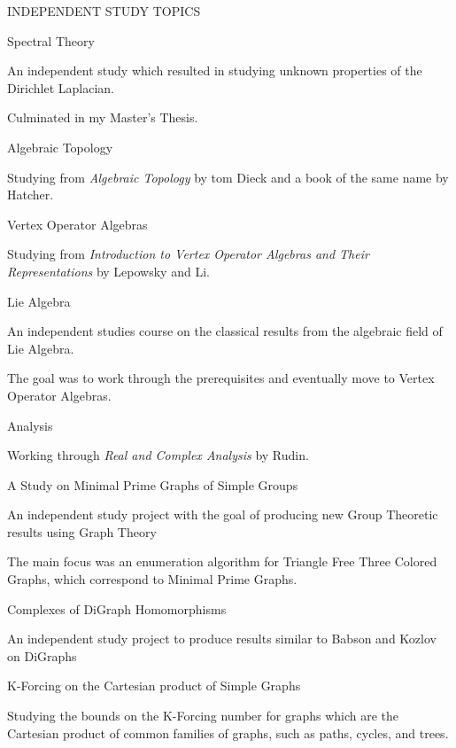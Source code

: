 \documentclass{resume} %
\begin{document}
\begin{rSection}{INDEPENDENT STUDY TOPICS}{}{} {}
 
 \begin{rSubsection}{Spectral Theory}{}{}{}
 \item An independent study which resulted in studying unknown properties of the Dirichlet Laplacian.
 \item Culminated in my Master's Thesis.
 \end{rSubsection}

 \begin{rSubsection}{Algebraic Topology}{}{}{}
 \item Studying from \textit{Algebraic Topology} by tom Dieck and a book of the same name by Hatcher. 
 \end{rSubsection}

 \begin{rSubsection}{Vertex Operator Algebras}{}{}{}
  \item Studying from \textit{Introduction to Vertex Operator Algebras and Their Representations} by Lepowsky and Li.
 \end{rSubsection}

 \begin{rSubsection}{Lie Algebra}{}{}{}
  \item An independent studies course on the classical results from the algebraic field of Lie Algebra.
  \item The goal was to work through the prerequisites and eventually move to Vertex Operator Algebras.
 \end{rSubsection}

 \begin{rSubsection}{Analysis}{}{}{}
 \item Working through \textit{Real and Complex Analysis} by Rudin.
 \end{rSubsection}

 \begin{rSubsection}{A Study on Minimal Prime Graphs of Simple Groups}{}{}{}
  \item An independent study project with the goal of producing new Group Theoretic results using Graph Theory
  \item The main focus was an enumeration algorithm for Triangle Free Three Colored Graphs, which correspond to Minimal Prime Graphs.
 \end{rSubsection}

 \begin{rSubsection}{Complexes of DiGraph Homomorphisms}{}{}{}
 \item An independent study project to produce results similar to Babson and Kozlov on DiGraphs
 \end{rSubsection}

 \begin{rSubsection}{K-Forcing on the Cartesian product of Simple Graphs}{}{}{}
 \item Studying the bounds on the K-Forcing number for graphs which are the Cartesian product of common families of graphs, such as paths, cycles, and trees.
 \end{rSubsection}

\end{rSection}
\end{document}
